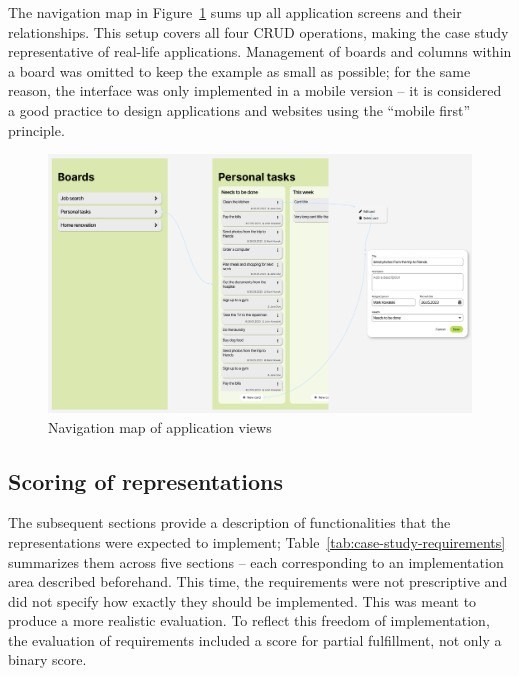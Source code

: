 The navigation map in Figure~\ref{fig:3-4-navigation-map} sums up all application screens and their relationships.
This setup covers all four CRUD operations, making the case study representative of real-life applications.
Management of boards and columns within a board was omitted to keep the example as small as possible;
for the same reason, the interface was only implemented in a mobile version -- it is considered a good practice to design applications and websites using the \enquote{mobile first} principle.

\begin{figure}
    \centering
    \includegraphics[width=\textwidth]{3-research-methodology/nav-map}
    \caption{Navigation map of application views}
    \label{fig:3-4-navigation-map}
\end{figure}

\subsection{Scoring of representations}\label{subsec:scoring-of-representations2}

The subsequent sections provide a description of functionalities that the representations were expected to implement;
Table~\ref{tab:case-study-requirements} summarizes them across five sections -- each corresponding to an implementation area described beforehand.
This time, the requirements were not prescriptive and did not specify how exactly they should be implemented.
This was meant to produce a more realistic evaluation.
To reflect this freedom of implementation, the evaluation of requirements included a score for partial fulfillment, not only a binary score.

